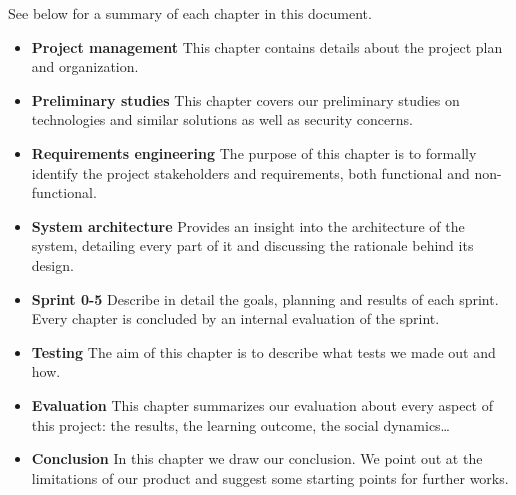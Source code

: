See below for a summary of each chapter in this document.

\begin{itemize}
	\item \textbf{Project management}\newline
		This chapter contains details about the project plan and organization.
	\item \textbf{Preliminary studies}\newline
		This chapter covers our preliminary studies on technologies
		and similar solutions as well as security concerns.
	\item \textbf{Requirements engineering}\newline
		The purpose of this chapter is to formally identify the project stakeholders
		and requirements, both functional and non-functional.
	\item \textbf{System architecture}\newline
		Provides an insight into the architecture of the system,
		detailing every part of it and discussing the rationale behind its design.
	\item \textbf{Sprint 0-5}\newline
		Describe in detail the goals, planning and results of each sprint.
		Every chapter is concluded by an internal evaluation of the sprint.
	\item \textbf{Testing}\newline
		The aim of this chapter is to describe what tests we made out and how.
	\item \textbf{Evaluation}\newline
		This chapter summarizes our evaluation about every aspect of this project:
		the results, the learning outcome, the social dynamics\ldots
	\item \textbf{Conclusion}\newline
		In this chapter we draw our conclusion.
		We point out at the limitations of our product and suggest some starting points
		for further works.
\end{itemize}